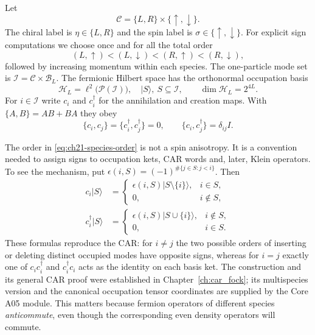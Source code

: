 \begin{definition}
\label{def:ch21-species}
Let
\begin{equation}
  \mathcal C=\{L,R\}\times\{\uparrow,\downarrow\}.
  \label{eq:ch21-species}
\end{equation}
The chiral label is $\eta\in\{L,R\}$ and the spin label is
$\sigma\in\{\uparrow,\downarrow\}$.  For explicit sign computations we
choose once and for all the total order
\begin{equation}
  (L,\uparrow)<(L,\downarrow)<(R,\uparrow)<(R,\downarrow),
  \label{eq:ch21-species-order}
\end{equation}
followed by increasing momentum within each species.  The one-particle mode
set is $\mathcal I=\mathcal C\times\mathcal B_L$.  The fermionic Hilbert
space has the orthonormal occupation basis
\begin{equation}
  \mathcal H_L=\ell^2\!\bigl(\mathcal P(\mathcal I)\bigr),
  \quad |S\rangle,\ S\subseteq\mathcal I,
  \qquad \dim\mathcal H_L=2^{4L}.
\end{equation}
For $i\in\mathcal I$ write $c_i$ and $c_i^\dagger$ for the
annihilation and creation maps.  With $\{A,B\}=AB+BA$ they obey
\begin{equation}
 \{c_i,c_j\}=\{c_i^\dagger,c_j^\dagger\}=0,
 \qquad \{c_i,c_j^\dagger\}=\delta_{ij}I.
 \label{eq:ch21-four-species-car}
\end{equation}
\end{definition}

The order in \eqref{eq:ch21-species-order} is not a spin anisotropy.  It is a
convention needed to assign signs to occupation kets, CAR words and, later,
Klein operators.  To see the mechanism, put
$\epsilon(i,S)=(-1)^{\#\{j\in S:j<i\}}$.  Then
\begin{align}
 c_i|S\rangle
   &=\begin{cases}\epsilon(i,S)|S\setminus\{i\}\rangle,&i\in S,\\
                     0,&i\notin S,\end{cases}\label{eq:ch21-ann-action}\\
 c_i^\dagger|S\rangle
   &=\begin{cases}\epsilon(i,S)|S\cup\{i\}\rangle,&i\notin S,\\
                     0,&i\in S.\end{cases}\label{eq:ch21-cre-action}
\end{align}
These formulas reproduce the CAR: for $i\ne j$ the two possible orders
of inserting or deleting distinct occupied modes have opposite signs,
whereas for $i=j$ exactly one of $c_ic_i^\dagger$ and
$c_i^\dagger c_i$ acts as the identity on each basis ket.
The construction and its general CAR proof were established in
Chapter~\ref{ch:car_fock}; its multispecies version and the canonical
occupation tensor coordinates are supplied by the Core A05 module.
This matters because fermion operators of different species
\emph{anticommute}, even though the corresponding even density operators
will commute.

